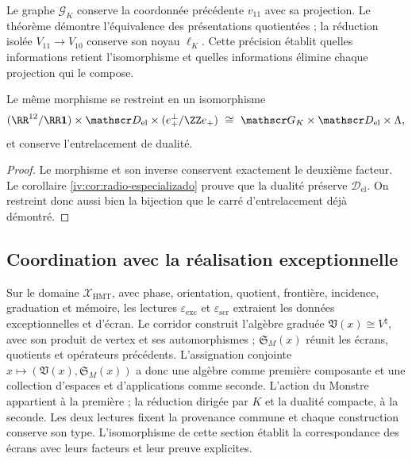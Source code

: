 Le graphe \(\mathscr G_K\) conserve la coordonnée précédente
\(v_{11}\) avec sa projection. Le théorème démontre
l’équivalence des présentations quotientées ; la réduction
isolée \(V_{11}\to V_{10}\) conserve son noyau
\(\ell_K\). Cette précision établit quelles informations
retient l’isomorphisme et quelles informations élimine chaque
projection qui le compose.


\begin{corollary}
Le même morphisme se restreint en un isomorphisme
\[
 (\RR^{12}/\RR\mathbf1)\times\mathscr D_{\mathrm{el}}
 \times(e_+^\perp/\ZZ e_+)
 \ \cong\ \mathscr G_K\times\mathscr D_{\mathrm{el}}\times\Lambda,
\]
et conserve l’entrelacement de dualité.
\end{corollary}
\begin{proof}
Le morphisme et son inverse conservent exactement le deuxième facteur.
Le corollaire \ref{iv:cor:radio-especializado} prouve que la dualité
préserve \(\mathscr D_{\mathrm{el}}\). On restreint donc
aussi bien la bijection que le carré d’entrelacement déjà démontré.
\end{proof}

\subsection{Coordination avec la réalisation exceptionnelle}

Sur le domaine \(\mathcal X_{\mathrm{HMT}}\), avec phase, orientation,
quotient, frontière, incidence, graduation et mémoire, les lectures
\(\varepsilon_{\mathrm{exc}}\) et \(\varepsilon_{\mathrm{scr}}\) extraient
les données exceptionnelles et d’écran. Le corridor construit l’algèbre
graduée \(\mathfrak V(x)\cong V^\natural\), avec son produit de vertex
et ses automorphismes ; \(\mathfrak S_M(x)\) réunit les écrans, quotients
et opérateurs précédents. L’assignation conjointe
\(x\mapsto(\mathfrak V(x),\mathfrak S_M(x))\) a donc une
algèbre comme première composante et une collection d’espaces et d’applications comme seconde.
L’action du Monstre appartient à la première ; la réduction dirigée par \(K\)
et la dualité compacte, à la seconde. Les deux lectures fixent la provenance
commune et chaque construction conserve son type.
L’isomorphisme de cette section établit la correspondance des
écrans avec leurs facteurs et leur preuve
explicites.

\par\endgroup
